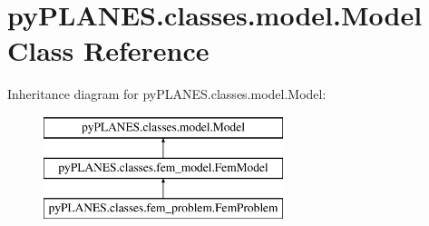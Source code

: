 \hypertarget{classpy_p_l_a_n_e_s_1_1classes_1_1model_1_1_model}{}\section{py\+P\+L\+A\+N\+E\+S.\+classes.\+model.\+Model Class Reference}
\label{classpy_p_l_a_n_e_s_1_1classes_1_1model_1_1_model}
Inheritance diagram for py\+P\+L\+A\+N\+E\+S.\+classes.\+model.\+Model\+:\begin{figure}[H]
\begin{center}
\leavevmode
\includegraphics[height=3.000000cm]{classpy_p_l_a_n_e_s_1_1classes_1_1model_1_1_model}
\end{center}
\end{figure}
